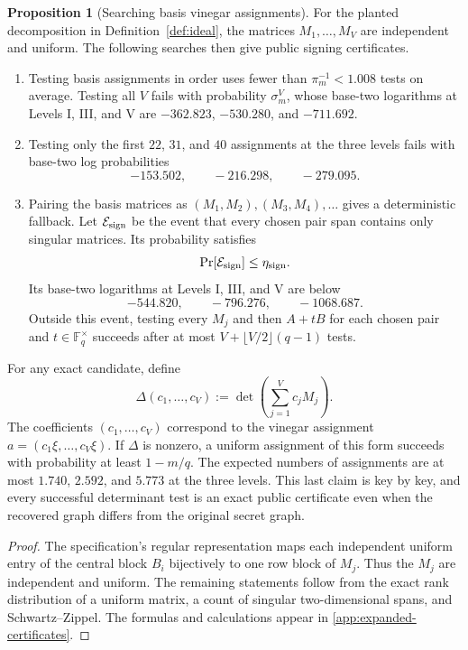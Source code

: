 \documentclass[11pt,a4paper]{article}
\theoremstyle{definition}
\newtheorem{proposition}[theorem]{Proposition}
\theoremstyle{remark}
\newcommand{\F}{\mathbb F}
\newcommand{\cE}{\mathcal E}
\begin{document}
\begin{proposition}[Searching basis vinegar assignments]\label{prop:signing-search}
For the planted decomposition in Definition~\ref{def:ideal}, the matrices
$M_1,\ldots,M_V$ are independent and uniform.  The following searches then
give public signing certificates.
\begin{enumerate}
\item Testing basis assignments in order uses fewer than
$\pi_m^{-1}<1.008$ tests on average.  Testing all $V$ fails with probability
$\sigma_m^V$, whose base-two logarithms at Levels I, III, and V are
$-362.823$, $-530.280$, and $-711.692$.

\item Testing only the first $22$, $31$, and $40$ assignments at the three
levels fails with base-two log probabilities
\begin{equation}\label{eq:compact-sign-logs}
 -153.502,\qquad-216.298,\qquad-279.095.
\end{equation}

\item Pairing the basis matrices as $(M_1,M_2),(M_3,M_4),\ldots$ gives a
deterministic fallback.  Let $\cE_{\rm sign}$ be the event that every chosen
pair span contains only singular matrices.  Its probability satisfies
\begin{equation}\label{eq:eta-sign}
 \Pr[\cE_{\rm sign}]\le\eta_{\rm sign}.
\end{equation}
Its base-two logarithms at Levels I, III, and V are below
\[
 -544.820,\qquad-796.276,\qquad-1068.687.
\]
Outside this event, testing every $M_j$ and then
$A+tB$ for each chosen pair and $t\in\F_q^\times$ succeeds after at most
$V+\lfloor V/2\rfloor(q-1)$ tests.
\end{enumerate}

For any exact candidate, define
\[
 \Delta(c_1,\ldots,c_V):=\det\!\left(\sum_{j=1}^V c_jM_j\right).
\]
The coefficients $(c_1,\ldots,c_V)$ correspond to the vinegar assignment
$a=(c_1\xi,\ldots,c_V\xi)$.  If $\Delta$ is nonzero, a uniform assignment of
this form succeeds
with probability at least $1-m/q$.  The expected numbers of assignments are
at most $1.740$, $2.592$, and $5.773$ at the three levels.  This last claim is
key by key, and every successful determinant test is an exact public
certificate even when the recovered graph differs from the original secret
graph.
\end{proposition}

\begin{proof}
The specification's regular representation maps each independent uniform
entry of the central block $B_i$ bijectively to one row block of $M_j$.  Thus
the $M_j$ are independent and uniform.  The remaining statements follow from
the exact rank distribution of a uniform matrix, a count of singular
two-dimensional spans, and Schwartz--Zippel.  The formulas and calculations
appear in \cref{app:expanded-certificates}.
\end{proof}
\end{document}
